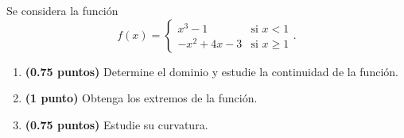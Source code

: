
Se considera la función
\[
f(x)=\begin{cases}x^3-1&\text{si }x<1\\-x^2+4x-3&\text{si }x\geq1\end{cases}.
\]
\begin{enumerate}[label=\alph*)]
\item \textbf{(0.75 puntos)} Determine el dominio y estudie la continuidad de la función.
\item \textbf{(1 punto)} Obtenga los extremos de la función.
\item \textbf{(0.75 puntos)} Estudie su curvatura.
\end{enumerate}
